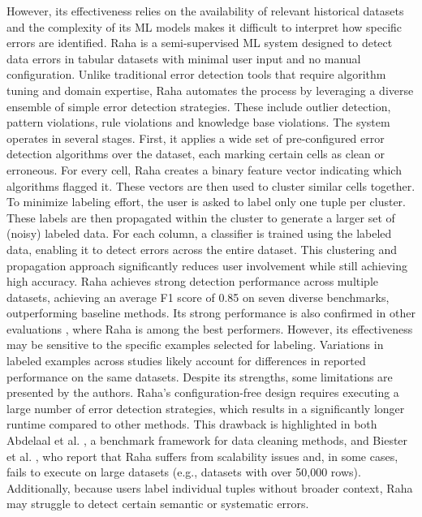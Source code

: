 However, its effectiveness relies on the availability of relevant historical datasets and the complexity of its ML models makes it difficult to interpret how specific errors are identified.
\newline\newline
Raha \cite{RAHA} is a semi-supervised ML system designed to detect data errors in tabular datasets with minimal user input and no manual configuration. 
Unlike traditional error detection tools that require algorithm tuning and domain expertise, Raha automates the process by leveraging a diverse ensemble of simple error detection strategies. 
These include outlier detection, pattern violations, rule violations and knowledge base violations. 
The system operates in several stages. 
First, it applies a wide set of pre-configured error detection algorithms over the dataset, each marking certain cells as clean or erroneous. 
For every cell, Raha creates a binary feature vector indicating which algorithms flagged it. 
These vectors are then used to cluster similar cells together. To minimize labeling effort, the user is asked to label only one tuple per cluster. 
These labels are then propagated within the cluster to generate a larger set of (noisy) labeled data. 
For each column, a classifier is trained using the labeled data, enabling it to detect errors across the entire dataset. 
This clustering and propagation approach significantly reduces user involvement while still achieving high accuracy. 
Raha achieves strong detection performance across multiple datasets, achieving an average F1 score of 0.85 on seven diverse benchmarks, outperforming baseline methods. 
Its strong performance is also confirmed in other evaluations \cite{SAGED, REIN}, where Raha is among the best performers. 
However, its effectiveness may be sensitive to the specific examples selected for labeling. 
Variations in labeled examples across studies likely account for differences in reported performance on the same datasets.
Despite its strengths, some limitations are presented by the authors. 
Raha's configuration-free design requires executing a large number of error detection strategies, which results in a significantly longer runtime compared to other methods. 
This drawback is highlighted in both Abdelaal et al. \cite{REIN}, a benchmark framework for data cleaning methods, and Biester et al. \cite{LLMCLEAN}, who report that Raha suffers from scalability issues and, in some cases, fails to execute on large datasets (e.g., datasets with over 50,000 rows). 
Additionally, because users label individual tuples without broader context, Raha may struggle to detect certain semantic or systematic errors. 
